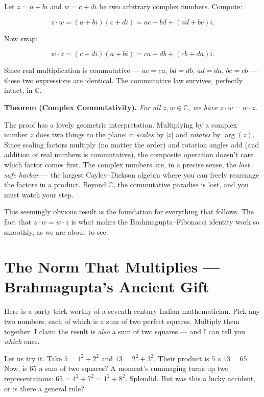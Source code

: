\documentclass[11pt,twoside,openright]{book}
\theoremstyle{definition}
\theoremstyle{remark}
\begin{document}
Let $z = a + bi$ and $w = c + di$ be two arbitrary complex numbers. Compute:

\[z \cdot w = (a + bi)(c + di) = ac - bd + (ad + bc)i.\]

Now swap:

\[w \cdot z = (c + di)(a + bi) = ca - db + (cb + da)i.\]

Since real multiplication is commutative --- $ac = ca$, $bd = db$, $ad = da$, $bc = cb$ --- these two expressions are identical. The commutative law survives, perfectly intact, in $\mathbb{C}$.

\textbf{Theorem (Complex Commutativity).} \textit{For all $z, w \in \mathbb{C}$, we have $z \cdot w = w \cdot z$.}


The proof has a lovely geometric interpretation. Multiplying by a complex number $z$ does two things to the plane: it \textit{scales} by $|z|$ and \textit{rotates} by $\arg(z)$. Since scaling factors multiply (no matter the order) and rotation angles add (and addition of real numbers is commutative), the composite operation doesn't care which factor comes first. The complex numbers are, in a precise sense, the \textit{last safe harbor} --- the largest Cayley--Dickson algebra where you can freely rearrange the factors in a product. Beyond $\mathbb{C}$, the commutative paradise is lost, and you must watch your step.

This seemingly obvious result is the foundation for everything that follows. The fact that $z \cdot w = w \cdot z$ is what makes the Brahmagupta--Fibonacci identity work so smoothly, as we are about to see.


\section{The Norm That Multiplies --- Brahmagupta's Ancient Gift}

Here is a party trick worthy of a seventh-century Indian mathematician. Pick any two numbers, each of which is a sum of two perfect squares. Multiply them together. I claim the result is \textit{also} a sum of two squares --- and I can tell you \textit{which} ones.

Let us try it. Take $5 = 1^2 + 2^2$ and $13 = 2^2 + 3^2$. Their product is $5 \times 13 = 65$. Now, is $65$ a sum of two squares? A moment's rummaging turns up two representations: $65 = 4^2 + 7^2 = 1^2 + 8^2$. Splendid. But was this a lucky accident, or is there a general rule?
\end{document}
